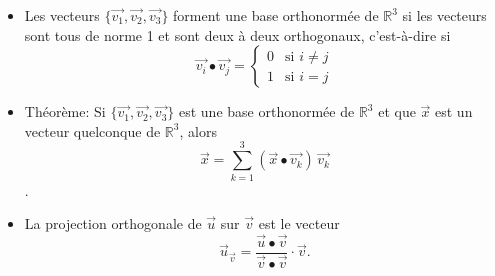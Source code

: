 \documentclass[12pt,a4paper]{article}
\newcommand{\vect}{\overrightarrow}
\begin{document}
\begin{itemize}[label=$\bullet$]
\newpage
\item Les vecteurs $\{\vect{v_1},\vect{v_2},\vect{v_3}\}$ forment une \colorbox{def!40}{base orthonormée} de $\mathbb{R}^3$ si les vecteurs sont tous de norme 1 et sont deux à deux orthogonaux, c'est-à-dire si $$\displaystyle \vect{v_i}\bullet\vect{v_j}=\left\{\begin{array}{cc} 0 & \text{si }i\neq j\\1 & \text{si } i=j\end{array}\right.$$
\item \textcolor{th!60!black}{Théorème}: Si $\{\vect{v_1},\vect{v_2},\vect{v_3}\}$ est une base orthonormée de $\mathbb{R}^3$ et que $\vect{x}$ est un vecteur quelconque de $\mathbb{R}^3$, alors $$\displaystyle \vect{x}=\sum_{k=1}^3 (\vect{x}\bullet\vect{v_k})\,\vect{v_k}$$.
\item La \colorbox{def!40}{projection orthogonale} de $\vect{u}$ sur $\vect{v}$ est le vecteur $$\displaystyle\vect{u}_{\vect{v}}=\frac{\vect{u}\bullet\vect{v}}{\vect{v}\bullet\vect{v}}\cdot\vect{v}.$$
\end{itemize}

\newpage
\end{document}
